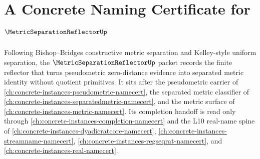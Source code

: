 \chapter{A Concrete Naming Certificate for $\MetricSeparationReflectorUp$}
\label{ch:concrete-instances-metric-separation-reflector-namecert}

Following Bishop--Bridges constructive metric separation and Kelley-style
uniform separation, the $\MetricSeparationReflectorUp$ packet records the
finite reflector that turns pseudometric zero-distance evidence into
separated metric identity without quotient primitives. It sits after the
pseudometric carrier of \autoref{ch:concrete-instances-pseudometric-namecert},
the separated metric classifier of
\autoref{ch:concrete-instances-separatedmetric-namecert}, and the metric
surface of \autoref{ch:concrete-instances-metric-namecert}. Its completion
handoff is read only through \autoref{ch:concrete-instances-completion-namecert}
and the L10 real-name spine of \autoref{ch:concrete-instances-dyadicratcore-namecert},
\autoref{ch:concrete-instances-streamname-namecert},
\autoref{ch:concrete-instances-regseqrat-namecert}, and
\autoref{ch:concrete-instances-real-namecert}.


